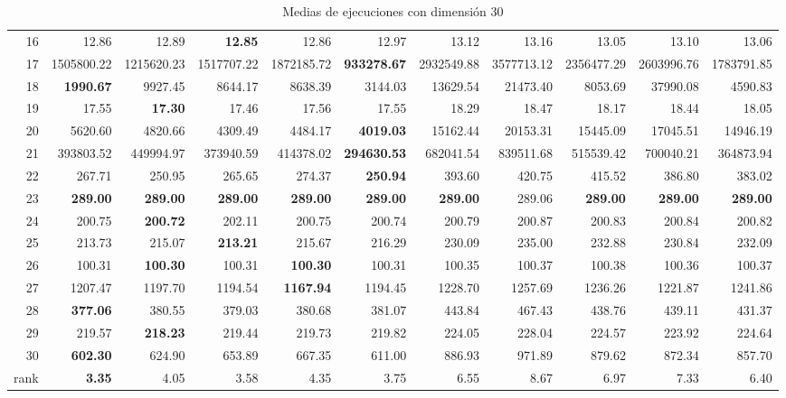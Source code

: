 \begin{table}[h!]
\begin{tabular}{rrrrrrrrrrr}
  16 & 12.86 & 12.89 & \textbf{12.85} & 12.86 & 12.97 & 13.12 & 13.16 & 13.05 & 13.10 & 13.06 \\ 
  17 & 1505800.22 & 1215620.23 & 1517707.22 & 1872185.72 & \textbf{933278.67} & 2932549.88 & 3577713.12 & 2356477.29 & 2603996.76 & 1783791.85 \\ 
  18 & \textbf{1990.67} & 9927.45 & 8644.17 & 8638.39 & 3144.03 & 13629.54 & 21473.40 & 8053.69 & 37990.08 & 4590.83 \\ 
  19 & 17.55 & \textbf{17.30} & 17.46 & 17.56 & 17.55 & 18.29 & 18.47 & 18.17 & 18.44 & 18.05 \\ 
  20 & 5620.60 & 4820.66 & 4309.49 & 4484.17 & \textbf{4019.03} & 15162.44 & 20153.31 & 15445.09 & 17045.51 & 14946.19 \\ 
  21 & 393803.52 & 449994.97 & 373940.59 & 414378.02 & \textbf{294630.53} & 682041.54 & 839511.68 & 515539.42 & 700040.21 & 364873.94 \\ 
  22 & 267.71 & 250.95 & 265.65 & 274.37 & \textbf{250.94} & 393.60 & 420.75 & 415.52 & 386.80 & 383.02 \\ 
  23 & \textbf{289.00} & \textbf{289.00} & \textbf{289.00} & \textbf{289.00} & \textbf{289.00} & \textbf{289.00} & 289.06 & \textbf{289.00} & \textbf{289.00} & \textbf{289.00} \\ 
  24 & 200.75 & \textbf{200.72} & 202.11 & 200.75 & 200.74 & 200.79 & 200.87 & 200.83 & 200.84 & 200.82 \\ 
  25 & 213.73 & 215.07 & \textbf{213.21} & 215.67 & 216.29 & 230.09 & 235.00 & 232.88 & 230.84 & 232.09 \\ 
  26 & 100.31 & \textbf{100.30} & 100.31 & \textbf{100.30} & 100.31 & 100.35 & 100.37 & 100.38 & 100.36 & 100.37 \\ 
  27 & 1207.47 & 1197.70 & 1194.54 & \textbf{1167.94} & 1194.45 & 1228.70 & 1257.69 & 1236.26 & 1221.87 & 1241.86 \\ 
  28 & \textbf{377.06} & 380.55 & 379.03 & 380.68 & 381.07 & 443.84 & 467.43 & 438.76 & 439.11 & 431.37 \\ 
  29 & 219.57 & \textbf{218.23} & 219.44 & 219.73 & 219.82 & 224.05 & 228.04 & 224.57 & 223.92 & 224.64 \\ 
  30 & \textbf{602.30} & 624.90 & 653.89 & 667.35 & 611.00 & 886.93 & 971.89 & 879.62 & 872.34 & 857.70 \\ 
  rank & \textbf{3.35} & 4.05 & 3.58 & 4.35 & 3.75 & 6.55 & 8.67 & 6.97 & 7.33 & 6.40 \\ 
   \hline
\end{tabular}
\endgroup
\caption{Medias de ejecuciones con dimensión 30} 
\label{d30}
\end{table}
